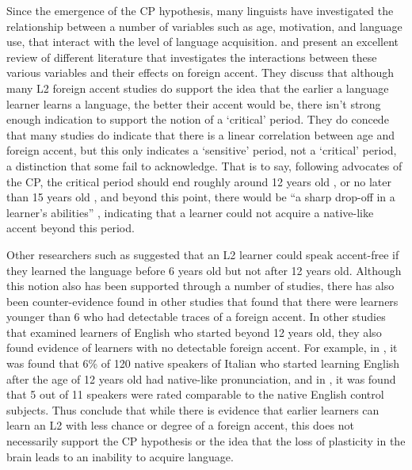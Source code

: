 \documentclass
[
    a4paper,
    twoside,
    12pt,
]
{report}
\begin{document}
Since the emergence of the CP hypothesis, many linguists have
investigated the relationship between a number of variables such as age,
motivation, and language use, that interact with the level of language
acquisition. \textcite{piske2001} and \textcite{lengeris2012} present an
excellent review of different literature that investigates the
interactions between these various variables and their effects on
foreign accent. They discuss that although many L2 foreign accent
studies do support the idea that the earlier a language learner learns a
language, the better their accent would be, there isn't strong enough
indication to support the notion of a `critical' period. They do concede
that many studies do indicate that there is a linear correlation between
age and foreign accent, but this only indicates a `sensitive' period,
not a `critical' period, a distinction that some fail to acknowledge.
That is to say, following advocates of the CP, the critical period
should end roughly around 12 years old \parencite{scovel1988a}, or no
later than 15 years old \parencite{patkowski1990}, and beyond this
point, there would be ``a sharp drop-off in a learner's abilities''
\parencite{lengeris2012}, indicating that a learner could not acquire a
native-like accent beyond this period.

Other researchers such as \textcite{long1990} suggested that an L2
learner could speak accent-free if they learned the language before 6
years old but not after 12 years old. Although this notion also has been
supported through a number of studies, there has also been
counter-evidence found in other studies that found that there were
learners younger than 6 who had detectable traces of a foreign accent.
In other studies that examined learners of English who started beyond 12
years old, they also found evidence of learners with no detectable
foreign accent. For example, in \textcite{flege1995}, it was found that
6\% of 120 native speakers of Italian who started learning English after
the age of 12 years old had native-like pronunciation, and in
\textcite{bongaerts1995}, it was found that 5 out of 11 speakers were
rated comparable to the native English control subjects. Thus
\textcite{piske2001} conclude that while there is evidence that earlier
learners can learn an L2 with less chance or degree of a foreign accent,
this does not necessarily support the CP hypothesis or the idea that the
loss of plasticity in the brain leads to an inability to acquire
language.
\end{document}
